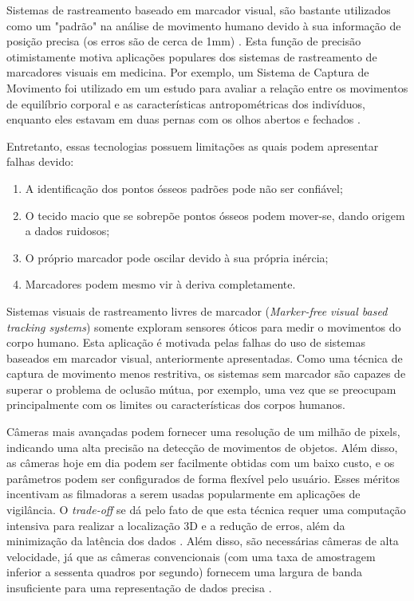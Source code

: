 Sistemas de rastreamento baseado em marcador visual, são bastante utilizados como um "padrão" na análise de movimento humano devido à sua informação de posição precisa (os erros são de cerca de 1mm) \cite{zhang2002visual}. Esta função de precisão otimistamente motiva aplicações populares dos sistemas de rastreamento de marcadores visuais em medicina. Por exemplo, um Sistema de Captura de Movimento foi utilizado em um estudo para avaliar a relação entre os movimentos de equilíbrio corporal e as características antropométricas dos indivíduos, enquanto eles estavam em duas pernas com os olhos abertos e fechados \cite{kejonen2003}.

Entretanto, essas tecnologias possuem limitações as quais podem apresentar falhas devido:

\begin{enumerate}
    \item A identificação dos pontos ósseos padrões pode não ser confiável; 
    \item O tecido macio que se sobrepõe pontos ósseos podem mover-se, dando origem a dados ruidosos; 
    \item O próprio marcador pode oscilar devido à sua própria inércia; 
    \item Marcadores podem mesmo vir à deriva completamente.
\end{enumerate}


Sistemas visuais de rastreamento livres de marcador (\textit{Marker-free visual based tracking systems}) somente exploram sensores óticos para medir o movimentos do corpo humano. Esta aplicação é motivada pelas falhas do uso de sistemas baseados em marcador visual, anteriormente apresentadas. Como uma técnica de captura de movimento menos restritiva, os sistemas sem marcador são capazes de superar o problema de oclusão mútua, por exemplo, uma vez que se preocupam principalmente com os limites ou características dos corpos humanos\cite{zhou2008human}.


Câmeras mais avançadas podem fornecer uma resolução de um milhão de pixels, indicando uma alta precisão na detecção de movimentos de objetos. Além disso, as câmeras hoje em dia podem ser facilmente obtidas com um baixo custo, e os parâmetros podem ser configurados de forma flexível pelo usuário. Esses méritos incentivam as filmadoras a serem usadas popularmente em aplicações de vigilância. O \textit{trade-off} se dá pelo fato de que esta técnica requer uma computação intensiva para realizar a localização 3D e a redução de erros, além da minimização da latência dos dados \cite{bryson1993}. Além disso, são necessárias câmeras de alta velocidade, já que as câmeras convencionais (com uma taxa de amostragem inferior a sessenta quadros por segundo) fornecem uma largura de banda insuficiente para uma representação de dados precisa \cite{bhatnagar1993position}.


